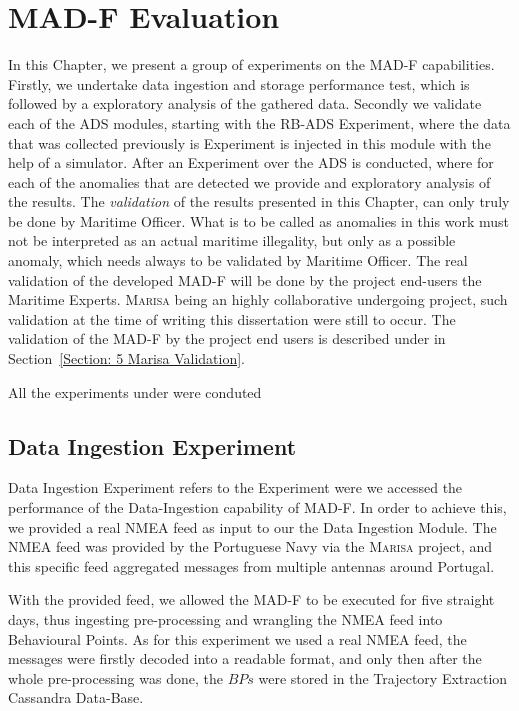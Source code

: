 \chapter{MAD-F Evaluation}
\label{chapter:Chapter 5}

In this Chapter, we present a group of experiments on the MAD-F capabilities. Firstly, we undertake data ingestion and storage performance test, which is followed by a exploratory analysis of the gathered data. Secondly we validate each of the ADS modules, starting with the RB-ADS Experiment, where the data that was collected previously is Experiment is injected in this module with the help of a simulator. After an Experiment over the ADS is conducted, where for each of the anomalies that are detected we provide and exploratory analysis of the results.
The \emph{validation} of the results presented in this Chapter, can only truly be done by Maritime Officer. What is to be called as anomalies in this work must not be interpreted as an actual maritime illegality, but only as a possible anomaly, which needs always to be validated by Maritime Officer. The real validation of the developed MAD-F will be done by the project end-users the Maritime Experts. \textsc{Marisa} being an highly collaborative undergoing project, such validation at the time of writing this dissertation were still to occur. The validation of the MAD-F by the project end users is described under in Section~\ref{Section: 5 Marisa Validation}. 

All the experiments under were conduted 


\section{Data Ingestion Experiment}
\label{section: Experiment Data}
Data Ingestion Experiment refers to the Experiment were we accessed the performance of the Data-Ingestion capability of MAD-F. In order to achieve this, we provided a real NMEA feed as input to our the Data Ingestion Module. The NMEA feed was provided by the Portuguese Navy via the \textsc{Marisa} project, and this specific feed aggregated messages from multiple antennas around Portugal.
 
With the provided feed, we allowed the MAD-F to be executed for five straight days, thus ingesting pre-processing and wrangling the NMEA feed into Behavioural Points. As for this experiment we used a real NMEA feed, the messages were firstly decoded into a readable format, and only then after the whole pre-processing was done, the $BPs$ were stored in the Trajectory Extraction Cassandra Data-Base.


